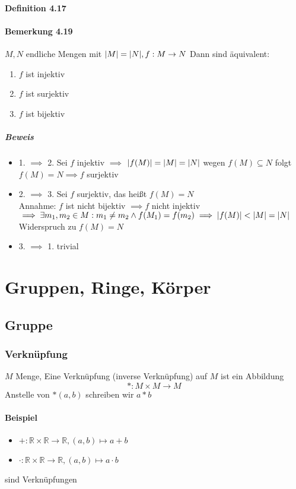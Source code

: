 \documentclass[a4paper]{scrartcl}
\DeclarePairedDelimiter\abs{\lvert}{\rvert}%
\theoremstyle{definition}
\theoremstyle{plain}
\theoremstyle{plain}
\theoremstyle{remark}
\theoremstyle{remark}
\theoremstyle{remark}
\theoremstyle{remark}
\theoremstyle{remark}
\begin{document}
\paragraph{Definition 4.17}
\label{sec-2-6-7-9}
\paragraph{Bemerkung 4.19}
\label{sec-2-6-7-10}
$M,N$ endliche Mengen mit $\abs{M} = \abs{N},f:M\to N$ Dann sind äquivalent:
\begin{enumerate}
\item $f$ ist injektiv
\item $f$ ist surjektiv
\item $f$ ist bijektiv
\end{enumerate}
\subparagraph{Beweis}
\label{sec-2-6-7-10-1}
\begin{itemize}
\item 1. $\implies$ 2. Sei $f$ injektiv $\implies$ $\abs{f(M)} = \abs{M} = \abs{N}$ wegen $f(M) \subseteq N$ folgt $f(M) = N \implies f$ surjektiv
\item 2. $\implies$ 3. Sei $f$ surjektiv, das heißt $f(M) = N$ \\
        Annahme: $f$ ist nicht bijektiv $\implies f$ nicht injektiv $\implies \exists m_1,m_2\in M: m_1\neq m_2 \wedge f(M_1) = f(m_2) \implies \abs{f(M)} < \abs{M} = \abs{N}$ Widerspruch zu $f(M) = N$
\item 3. $\implies$ 1. trivial
\end{itemize}
\section{Gruppen, Ringe, Körper}
\label{sec-3}
\subsection{Gruppe}
\label{sec-3-1}
\subsubsection{Verknüpfung}
\label{sec-3-1-1}
$M$ Menge, Eine Verknüpfung (inverse Verknüpfung) auf $M$ ist ein Abbildung \[*:M\times M \to M\]
Anstelle von $*(a,b)$ schreiben wir $a * b$
\paragraph{Beispiel}
\label{sec-3-1-1-1}
\begin{itemize}
\item $+: \mathbb{R} \times \mathbb{R} \to \mathbb{R},(a,b) \mapsto a + b$
\item $\cdot: \mathbb{R} \times \mathbb{R} \to \mathbb{R},(a,b) \mapsto a\cdot b$
\end{itemize}
sind Verknüpfungen
\end{document}
